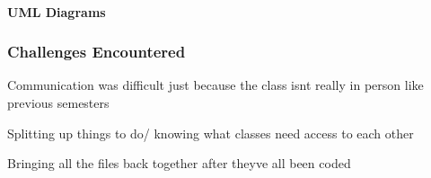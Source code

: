 \paragraph*{U\+ML Diagrams}

 

\subsubsection*{Challenges Encountered}


\begin{DoxyItemize}
\item Communication was difficult just because the class isn\textquotesingle{}t really in person like previous semesters
\item Splitting up things to do/ knowing what classes need access to each other
\item Bringing all the files back together after they\textquotesingle{}ve all been coded 
\end{DoxyItemize}